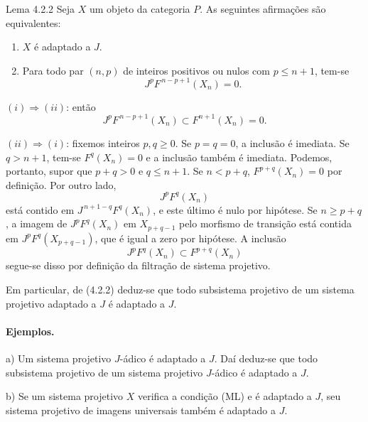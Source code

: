 \begin{statement}{Lema 4.2.2}
Seja \(X\) um objeto da categoria \(P\). As seguintes afirmações são equivalentes:
\begin{enumerate}[label=\textup{(\roman*)}]
\item \(X\) é adaptado a \(J\).
\item Para todo par \((n,p)\) de inteiros positivos ou nulos com \(p\le n+1\), tem-se
\[
J^pF^{\,n-p+1}(X_n)=0 .
\]
\end{enumerate}
\end{statement}

\begin{prooftext}
\((i)\Rightarrow(ii)\): então
\[
J^pF^{\,n-p+1}(X_n)\subset F^{n+1}(X_n)=0.
\]

\((ii)\Rightarrow(i)\): fixemos inteiros \(p,q\ge0\). Se \(p=q=0\), a inclusão é imediata. Se \(q>n+1\), tem-se \(F^q(X_n)=0\) e a inclusão também é imediata. Podemos, portanto, supor que \(p+q>0\) e \(q\le n+1\). Se \(n<p+q\), \(F^{p+q}(X_n)=0\) por definição. Por outro lado,
\[
J^pF^q(X_n)
\]
está contido em \(J^{\,n+1-q}F^q(X_n)\), e este último é nulo por hipótese. Se \(n\ge p+q\), a imagem de \(J^pF^q(X_n)\) em \(X_{p+q-1}\) pelo morfismo de transição está contida em \(J^pF^q(X_{p+q-1})\), que é igual a zero por hipótese. A inclusão
\[
J^pF^q(X_n)\subset F^{p+q}(X_n)
\]
segue-se disso por definição da filtração de sistema projetivo.

Em particular, de (4.2.2) deduz-se que todo subsistema projetivo de um sistema projetivo adaptado a \(J\) é adaptado a \(J\).
\end{prooftext}

\paragraph{Ejemplos.}
a) Um sistema projetivo \(J\)-ádico é adaptado a \(J\). Daí deduz-se que todo subsistema projetivo de um sistema projetivo \(J\)-ádico é adaptado a \(J\).

b) Se um sistema projetivo \(X\) verifica a condição (ML) e é adaptado a \(J\), seu sistema projetivo de imagens universais também é adaptado a \(J\).
